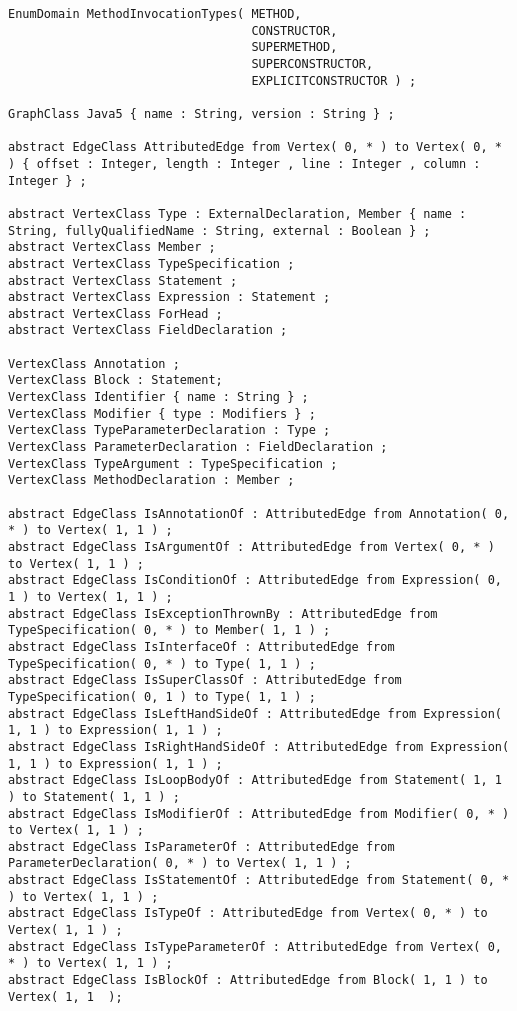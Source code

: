 \begin{lstlisting}[caption=Das im Javaextraktor eingesetzte Schema, label=schema_complete, captionpos=b, style=tgschema]
EnumDomain MethodInvocationTypes( METHOD,
                                  CONSTRUCTOR,
                                  SUPERMETHOD,
                                  SUPERCONSTRUCTOR,
                                  EXPLICITCONSTRUCTOR ) ;
                                  
GraphClass Java5 { name : String, version : String } ;

abstract EdgeClass AttributedEdge from Vertex( 0, * ) to Vertex( 0, * ) { offset : Integer, length : Integer , line : Integer , column : Integer } ;

abstract VertexClass Type : ExternalDeclaration, Member { name : String, fullyQualifiedName : String, external : Boolean } ;
abstract VertexClass Member ;
abstract VertexClass TypeSpecification ;
abstract VertexClass Statement ;
abstract VertexClass Expression : Statement ;
abstract VertexClass ForHead ;
abstract VertexClass FieldDeclaration ;

VertexClass Annotation ;
VertexClass Block : Statement;
VertexClass Identifier { name : String } ;
VertexClass Modifier { type : Modifiers } ;
VertexClass TypeParameterDeclaration : Type ;
VertexClass ParameterDeclaration : FieldDeclaration ;
VertexClass TypeArgument : TypeSpecification ;
VertexClass MethodDeclaration : Member ;

abstract EdgeClass IsAnnotationOf : AttributedEdge from Annotation( 0, * ) to Vertex( 1, 1 ) ;
abstract EdgeClass IsArgumentOf : AttributedEdge from Vertex( 0, * ) to Vertex( 1, 1 ) ;
abstract EdgeClass IsConditionOf : AttributedEdge from Expression( 0, 1 ) to Vertex( 1, 1 ) ;
abstract EdgeClass IsExceptionThrownBy : AttributedEdge from TypeSpecification( 0, * ) to Member( 1, 1 ) ;
abstract EdgeClass IsInterfaceOf : AttributedEdge from TypeSpecification( 0, * ) to Type( 1, 1 ) ;
abstract EdgeClass IsSuperClassOf : AttributedEdge from TypeSpecification( 0, 1 ) to Type( 1, 1 ) ;
abstract EdgeClass IsLeftHandSideOf : AttributedEdge from Expression( 1, 1 ) to Expression( 1, 1 ) ;
abstract EdgeClass IsRightHandSideOf : AttributedEdge from Expression( 1, 1 ) to Expression( 1, 1 ) ;
abstract EdgeClass IsLoopBodyOf : AttributedEdge from Statement( 1, 1 ) to Statement( 1, 1 ) ;
abstract EdgeClass IsModifierOf : AttributedEdge from Modifier( 0, * ) to Vertex( 1, 1 ) ;
abstract EdgeClass IsParameterOf : AttributedEdge from ParameterDeclaration( 0, * ) to Vertex( 1, 1 ) ;
abstract EdgeClass IsStatementOf : AttributedEdge from Statement( 0, * ) to Vertex( 1, 1 ) ;
abstract EdgeClass IsTypeOf : AttributedEdge from Vertex( 0, * ) to Vertex( 1, 1 ) ;
abstract EdgeClass IsTypeParameterOf : AttributedEdge from Vertex( 0, * ) to Vertex( 1, 1 ) ;
abstract EdgeClass IsBlockOf : AttributedEdge from Block( 1, 1 ) to Vertex( 1, 1  );


\end{lstlisting}
